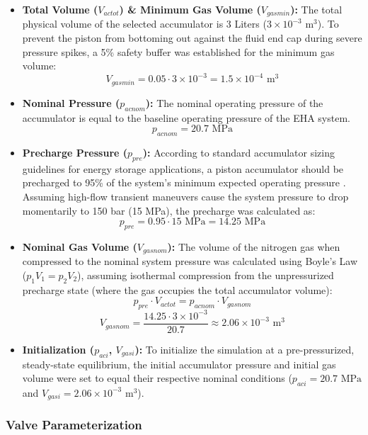 \documentclass[
bindingoffset=5mm,  %
footnoteindent=3mm, %
hyphenation=true    %
]{src/wut-thesis}
\begin{document}
	\begin{itemize}
		\item \textbf{Total Volume ($V_{actot}$) \& Minimum Gas Volume ($V_{gasmin}$):} The total physical volume of the selected accumulator is 3 Liters ($3 \times 10^{-3} \text{ m}^3$). To prevent the piston from bottoming out against the fluid end cap during severe pressure spikes, a 5\% safety buffer was established for the minimum gas volume:
		$$V_{gasmin} = 0.05 \cdot 3 \times 10^{-3} = 1.5 \times 10^{-4} \text{ m}^3$$
		
		\item \textbf{Nominal Pressure ($p_{acnom}$):} The nominal operating pressure of the accumulator is equal to the baseline operating pressure of the EHA system.
		$$p_{acnom} = 20.7 \text{ MPa}$$
		
		\item \textbf{Precharge Pressure ($p_{pre}$):} According to standard accumulator sizing guidelines for energy storage applications, a piston accumulator should be precharged to 95\% of the system's minimum expected operating pressure \cite{parker_accumulator_choice}. Assuming high-flow transient maneuvers cause the system pressure to drop momentarily to 150 bar (15 MPa), the precharge was calculated as:
		$$p_{pre} = 0.95 \cdot 15 \text{ MPa} = 14.25 \text{ MPa}$$
		
		\item \textbf{Nominal Gas Volume ($V_{gasnom}$):} The volume of the nitrogen gas when compressed to the nominal system pressure was calculated using Boyle's Law ($p_1V_1 = p_2V_2$), assuming isothermal compression from the unpressurized precharge state (where the gas occupies the total accumulator volume):
		$$p_{pre} \cdot V_{actot} = p_{acnom} \cdot V_{gasnom}$$
		$$V_{gasnom} = \frac{14.25 \cdot 3 \times 10^{-3}}{20.7} \approx 2.06 \times 10^{-3} \text{ m}^3$$
		
		\item \textbf{Initialization ($p_{aci}$, $V_{gasi}$):} To initialize the simulation at a pre-pressurized, steady-state equilibrium, the initial accumulator pressure and initial gas volume were set to equal their respective nominal conditions ($p_{aci} = 20.7 \text{ MPa}$ and $V_{gasi} = 2.06 \times 10^{-3} \text{ m}^3$).
	\end{itemize}
	
	\subsubsection{Valve Parameterization}
	
\end{document}
